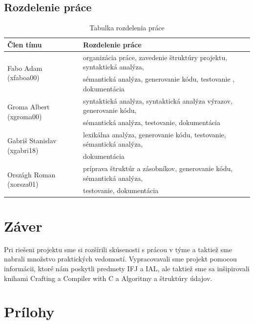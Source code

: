 \documentclass[a4paper,11pt]{article}
\begin{document}
		\subsection{Rozdelenie práce}\label{subsec:rozpra}
		\begin{table}[h]
		\begin{center}
			\begin{tabular}{|l|l|}
				\hline
				\bfseries Člen tímu &
				\bfseries Rozdelenie práce \\ \hline
				\multirow{2}{*}{Fabo Adam  (xfaboa00)} & organizácia práce, zavedenie štruktúry projektu, syntaktická analýza,\\
				&sémantická analýza, generovanie kódu, testovanie , dokumentácia\\
				\multirow{2}{*}{Groma Albert  (xgroma00)} & syntaktická analýza, syntaktická analýza výrazov, generovanie kódu,\\
				&sémantická analýza, testovanie, dokumentácia\\
				\multirow{2}{*}{Gabriš Stanislav (xgabri18)} & lexikálna analýza, generovanie kódu, testovanie, sémantická analýza,\\
				&dokumentácia\\ 
				\multirow{2}{*}{Országh Roman  (xorsza01)} & príprava štruktúr a zásobníkov, generovanie kódu, sémantická analýza,\\
				&testovanie, dokumentácia\\ \hline
			\end{tabular}
			\caption{Tabulka rozdelenia práce}
			\label{tab:rozprac}
		\end{center}
		\end{table}
	\section{Záver}\label{sec:zaver}

	\noindent Pri riešeni projektu sme si rozšírili skúsenosti s prácou v týme a taktiež sme nabrali množstvo praktických vedomostí. Vypracovavali sme projekt pomocou informácii, ktoré nám poskytli predmety IFJ a IAL, ale taktiež sme sa inšipirovali knihami Crafting a Compiler with C\cite{Fischer:1991} a Algoritmy a štruktúry údajov\cite{Wirth:1988}.\\

	\cleardoublepage
	\section{Prílohy}\label{sec:prilohy}
\end{document}

